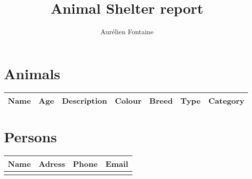\documentclass[10pt,a4paper]{article}
\author{Aurélien Fontaine}
\title{Animal Shelter report}
\begin{document}
	\part{Animals}
	\begin{center}
		\begin{tabular}{|c|c|p{5cm}|c|c|c|c|}
		\hline
		\textbf{Name} & \textbf{Age} & \textbf{Description} & \textbf{Colour}
		& \textbf{Breed} & \textbf{Type} & \textbf{Category} \\
		\hline
		\end{tabular}
	\end{center}

	\part{Persons}
	\begin{center}
		\begin{tabular}{|c|p{5cm}|c|c|}
		\hline
		\textbf{Name} & \textbf{Adress} & \textbf{Phone} & \textbf{Email} \\
		\hline
		& & & \\
		\end{tabular}
	\end{center}
\end{document}
